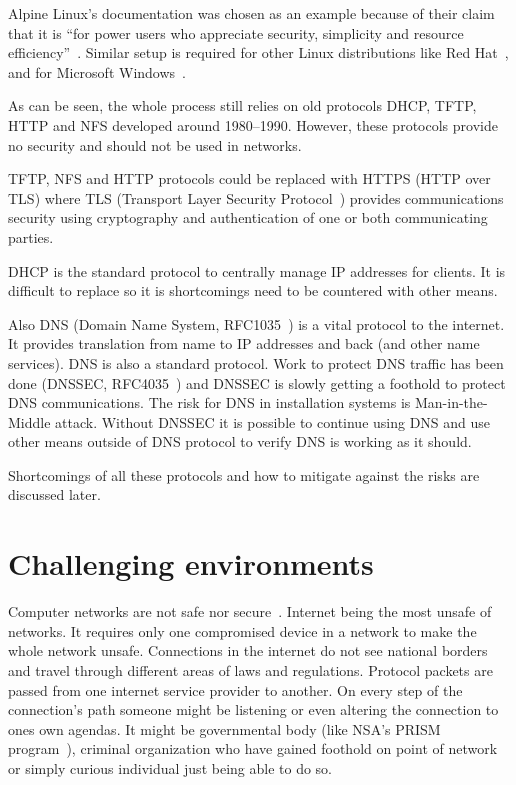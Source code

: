 Alpine Linux's documentation was chosen as an example because of their
claim that it is ``for power users who appreciate security, simplicity
and resource efficiency''~\cite{alpine-about}. Similar setup is
required for other Linux distributions like Red
Hat~\cite{redhat-network-install}, and for Microsoft
Windows~\cite{windows-network-install}.

As can be seen, the whole process still relies on old protocols DHCP,
TFTP, HTTP and NFS developed around 1980--1990. However, these
protocols provide no security and should not be used in
networks.

TFTP, NFS and HTTP protocols could be replaced with HTTPS (HTTP over
TLS) where TLS (Transport Layer Security Protocol~\cite{RFC5246})
provides communications security using cryptography and authentication
of one or both communicating parties.

DHCP is the standard protocol to centrally manage IP addresses for
clients. It is difficult to replace so it is shortcomings need to be
countered with other means.

Also DNS (Domain Name System, RFC1035~\cite{rfc1035}) is a vital
protocol to the internet. It provides translation from name to IP
addresses and back (and other name services). DNS is also a standard
protocol. Work to protect DNS traffic has been done (DNSSEC,
RFC4035~\cite{rfc4035}) and DNSSEC is slowly getting a foothold to
protect DNS communications. The risk for DNS in installation systems
is Man-in-the-Middle attack. Without DNSSEC it is possible to continue
using DNS and use other means outside of DNS protocol to verify DNS is
working as it should.

Shortcomings of all these protocols and how to mitigate against the
risks are discussed later.

\section{Challenging environments}

Computer networks are not safe nor secure~\cite{beyondcorp}. Internet
being the most unsafe of networks. It requires only one compromised
device in a network to make the whole network unsafe. Connections in
the internet do not see national borders and travel through different
areas of laws and regulations. Protocol packets are passed from one
internet service provider to another. On every step of the
connection's path someone might be listening or even altering the
connection to ones own agendas. It might be governmental body (like
NSA's PRISM program~\cite{nsa-prism}), criminal organization who have
gained foothold on point of network or simply curious individual just
being able to do so.

